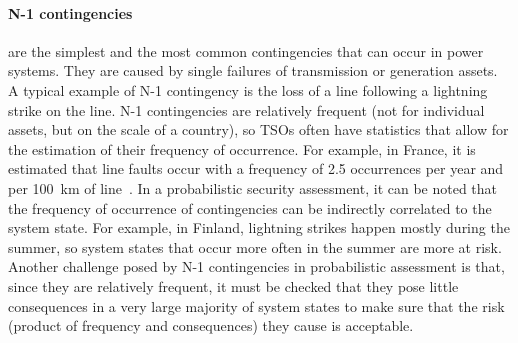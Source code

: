 \paragraph*{N-1 contingencies} are the simplest and the most common contingencies that can occur in power systems. They are caused by single failures of transmission or generation assets. A typical example of N-1 contingency is the loss of a line following a lightning strike on the line. N-1 contingencies are relatively frequent (not for individual assets, but on the scale of a country), so TSOs often have statistics that allow for the estimation of their frequency of occurrence. For example, in France, it is estimated that line faults occur with a frequency of 2.5 occurrences per year and per 100~km of line~\cite{FaultStatisticsFrance}. In a probabilistic security assessment, it can be noted that the frequency of occurrence of contingencies can be indirectly correlated to the system state. For example, in Finland, lightning strikes happen mostly during the summer, so system states that occur more often in the summer are more at risk. Another challenge posed by N-1 contingencies in probabilistic assessment is that, since they are relatively frequent, it must be checked that they pose little consequences in a very large majority of system states to make sure that the risk (product of frequency and consequences) they cause is acceptable.


